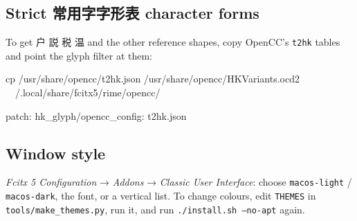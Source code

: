 \documentclass[11pt,a4paper]{article}
\newcommand{\code}[1]{\texttt{#1}}
\newenvironment{codeblock}{\begin{tcolorbox}[codebox]}{\end{tcolorbox}}
\begin{document}
\subsection{Strict 常用字字形表 character forms}\label{sec:strict}
To get 户 説 税 温 and the other reference shapes, copy OpenCC's \code{t2hk} tables and point
the glyph filter at them:
\begin{codeblock}
\begin{shell}
cp /usr/share/opencc/t2hk.json /usr/share/opencc/HKVariants.ocd2 \
   ~/.local/share/fcitx5/rime/opencc/
\end{shell}
\end{codeblock}
\begin{codeblock}
\begin{shell}
patch:
  hk_glyph/opencc_config: t2hk.json
\end{shell}
\end{codeblock}

\subsection{Window style}
\emph{Fcitx 5 Configuration} → \emph{Addons} → \emph{Classic User Interface}: choose
\code{macos-light} / \code{macos-dark}, the font, or a vertical list. To change colours, edit
\code{THEMES} in \code{tools/make\_themes.py}, run it, and run \code{./install.sh --no-apt} again.

\end{document}
